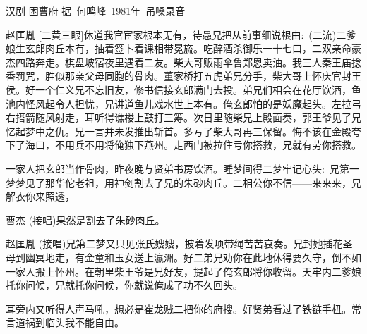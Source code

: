 汉剧 困曹府 据~何鸣峰~1981年~吊嗓录音

赵匡胤 [二黄三眼]休道我官宦家根本无有，待愚兄把从前事细说根由:~(二流)二爹娘生玄郎肉丘本有，抽着签卜着课相带冕旒。吃醉酒杀御乐一十七口，二双亲命豪杰四路奔走。棋盘坡宿夜里遇着二友。柴大哥贩雨伞鲁郑恩卖油。我三人秦王庙捻香罚咒，胜似那亲父母同胞的骨肉。董家桥打五虎弟兄分手，柴大哥上怀庆官封王侯。好一个仁义兄不忘旧友，修书信接玄郎满门去投。弟兄们相会在花厅饮酒，鱼池内怪风起令人担忧，兄讲道鱼儿戏水世上本有。俺玄郎怕的是妖魔起头。左拉弓右搭箭随风射走，耳听得谯楼上鼓打三筹。次日里随柴兄上殿面奏，郭王爷见了兄忆起梦中之仇。兄一言并未发推出斩首。多亏了柴大哥再三保留。悔不该在金殿夸下了海口，不用兵不用将俺独下燕州。走西门被拉住亏你搭救，兄就有劳你搭救。

一家人把玄郎当作骨肉，昨夜晚与贤弟书房饮酒。睡梦间得二梦牢记心头:~兄第一梦梦见了那华佗老祖，用神剑割去了兄的朱砂肉丘。二相公你不信——来来来，兄解衣你来照透，

曹杰   (接唱)果然是割去了朱砂肉丘。

赵匡胤	(接唱)兄第二梦又只见张氏嫂嫂，披着发项带绳苦苦哀奏。兄封她插花圣母到幽冥地走，有金童和玉女送上瀛洲。好二弟兄劝你在此地休得要久守，倒不如一家人搬上怀州。在朝里柴王爷是兄好友，提起了俺玄郎将你收留。天牢内二爹娘托你问候，兄就托你问候，你就说俺成了功不久回头。

耳旁内又听得人声马吼，想必是崔龙贼二把你的府搜。好贤弟看过了铁链手杻。常言道祸到临头我不能自由。
